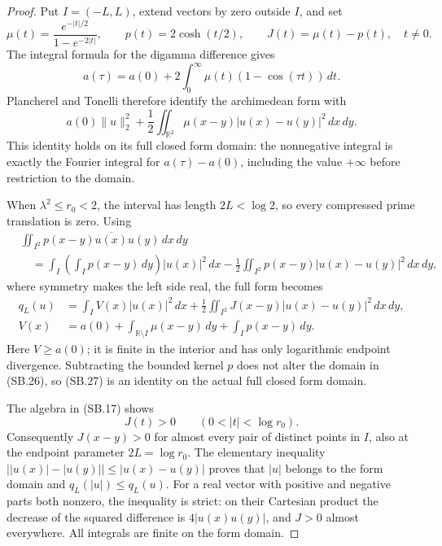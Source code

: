 \begin{proof}
Put \(I=(-L,L)\), extend vectors by zero outside \(I\), and set
\[
 \mu(t)=\frac{e^{-|t|/2}}{1-e^{-2|t|}},\qquad
 p(t)=2\cosh(t/2),\qquad J(t)=\mu(t)-p(t),\quad t\ne0.
\]
The integral formula for the digamma difference gives
\[
 a(\tau)=a(0)+2\int_0^\infty
                 \mu(t)(1-\cos(\tau t))\,dt .
\]
Plancherel and Tonelli therefore identify the archimedean form with
\[
 a(0)\|u\|_2^2+
 \frac12\iint_{\mathbb R^2}
                \mu(x-y)|u(x)-u(y)|^2\,dx\,dy.
                                                               \tag{SB.26}
\]
This identity holds on its full closed form domain: the nonnegative
integral is exactly the Fourier integral for \(a(\tau)-a(0)\),
including the value \(+\infty\) before restriction to the domain.

When \(\lambda^2\leq r_0<2\), the interval has length
\(2L<\log2\), so every compressed prime translation is zero.
Using
\[
 \begin{aligned}
 &\iint_{I^2}p(x-y)\overline{u(x)}u(y)\,dx\,dy\\
 &\quad=\int_I\left(\int_Ip(x-y)\,dy\right)|u(x)|^2\,dx
       -\frac12\iint_{I^2}p(x-y)|u(x)-u(y)|^2\,dx\,dy,
 \end{aligned}
\]
where symmetry makes the left side real, the full form becomes
\[
 \begin{aligned}
 q_L(u)&=\int_I V(x)|u(x)|^2\,dx+
       \frac12\iint_{I^2}J(x-y)|u(x)-u(y)|^2\,dx\,dy,
 \\
 V(x)&=a(0)+\int_{\mathbb R\setminus I}\mu(x-y)\,dy
                         +\int_Ip(x-y)\,dy .
 \end{aligned}                                                \tag{SB.27}
\]
Here \(V\geq a(0)\); it is finite in the interior and has only
logarithmic endpoint divergence.  Subtracting the bounded kernel
\(p\) does not alter the domain in (SB.26), so (SB.27) is an
identity on the actual full closed form domain.

The algebra in (SB.17) shows
\[
 J(t)>0\qquad(0<|t|<\log r_0).
\]
Consequently \(J(x-y)>0\) for almost every pair of distinct points
in \(I\), also at the endpoint parameter \(2L=\log r_0\).
The elementary inequality
\(\bigl||u(x)|-|u(y)|\bigr|\leq|u(x)-u(y)|\) proves that
\(|u|\) belongs to the form domain and \(q_L(|u|)\leq q_L(u)\).
For a real vector with positive and negative parts both nonzero,
the inequality is strict: on their Cartesian product the decrease
of the squared difference is \(4|u(x)u(y)|\), and \(J>0\)
almost everywhere.  All integrals are finite on the form domain.


\end{proof}
